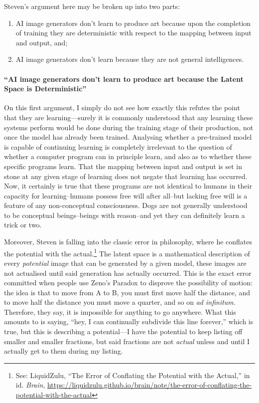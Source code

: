 \documentclass[11pt]{article}
\begin{document}
Steven's argument here may be broken up into two parts:
\begin{enumerate}
\item AI image generators don't learn to produce art because upon the completion of training they are deterministic with respect to the mapping between input and output, and;
\item AI image generators don't learn because they are not general intelligences.
\end{enumerate}

\paragraph*{``AI image generators don't learn to produce art because the Latent Space is Deterministic''}
\label{sec:orgf4f511b}
On this first argument, I simply do not see how exactly this refutes the point that they are learning---surely it is commonly understood that any learning these systems perform would be done during the training stage of their production, not once the model has already been trained. Analysing whether a pre-trained model is capable of continuing learning is completely irrelevant to the question of whether a computer program can in principle learn, and also as to whether these specific programs learn. That the mapping between input and output is set in stone at any given stage of learning does not negate that learning has occurred. Now, it certainly is true that these programs are not identical to humans in their capacity for learning--humans possess free will after all--but lacking free will is a feature of any non-conceptual consciousness. Dogs are not generally understood to be conceptual beings--beings with reason--and yet they can definitely learn a trick or two.

Moreover, Steven is falling into the classic error in philosophy, where he conflates the potential with the actual.\footnote{See: LiquidZulu, ``The Error of Conflating the Potential with the Actual,'' in id. \emph{Brain}, \url{https://liquidzulu.github.io/brain/note/the-error-of-conflating-the-potential-with-the-actual}} The latent space is a mathematical description of every \emph{potential} image that can be generated by a given model, these images are not actualised until said generation has actually occurred. This is the exact error committed when people use Zeno's Paradox to disprove the possibility of motion: the idea is that to move from A to B, you must first move half the distance, and to move half the distance you must move a quarter, and so on \emph{ad infinitum}. Therefore, they say, it is impossible for anything to go anywhere. What this amounts to is saying, ``hey, I can continually subdivide this line forever,'' which is true, but this is describing a potential---I have the potential to keep listing off smaller and smaller fractions, but said fractions are not \emph{actual} unless and until I actually get to them during my listing.
\end{document}
